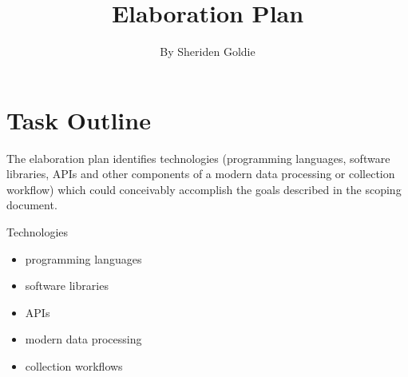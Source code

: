 \documentclass{article}
\title{Elaboration Plan}
\author{By Sheriden Goldie}
\date{}
\begin{document}
\maketitle

\section{Task Outline}

The elaboration plan identifies technologies (programming languages, software libraries, APIs and other components of a modern data processing or collection workflow) which could conceivably accomplish the goals described in the scoping document.

Technologies
\begin{itemize}
    \item programming languages
    \item software libraries
    \item APIs
    \item modern data processing
    \item collection workflows
\end{itemize}
\end{document}
